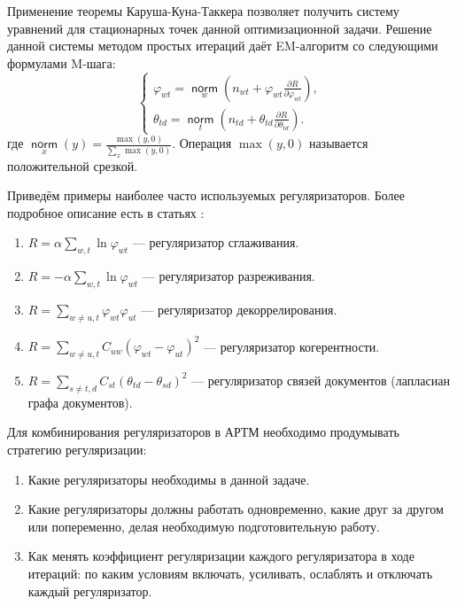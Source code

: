 \documentclass[12pt]{article}
\renewcommand{\phi}{\varphi}
\newcommand{\norm}{\mathop{\mathsf{norm}}\limits}
\begin{document}
Применение теоремы Каруша-Куна-Таккера позволяет получить систему уравнений для стационарных точек данной оптимизационной задачи. Решение данной системы методом простых итераций даёт EM-алгоритм со следующими формулами M-шага:
\[
\left\{
	\begin{aligned}
\phi_{wt} = \norm_w  \left(n_{wt} + \phi_{wt}\frac{\partial R}{\partial\phi_{wt}}\right),\\
\theta_{td} = \norm_t  \left(n_{td} + \theta_{td}\frac{\partial R}{\partial\theta_{td}}\right).
	\end{aligned}
\right.
\]
где $\norm_x(y) = \frac{\max(y, 0)}{\sum\limits_x \max(y, 0)}$. Операция $\max(y, 0)$ называется положительной срезкой.

Приведём примеры наиболее часто используемых регуляризаторов. Более подробное описание есть в статьях \cite{vorontsov2014additive, vorontsov2014tutorial, vorontsov2015additive}:
\begin{enumerate}
\item $R = \alpha \sum\limits_{w, t} \ln \phi_{wt}$ --- регуляризатор сглаживания.
\item $R = -\alpha \sum\limits_{w, t} \ln \phi_{wt}$ --- регуляризатор разреживания.
\item $R = \sum\limits_{w \neq u, t} \phi_{wt} \phi_{ut}$ --- регуляризатор декоррелирования.
\item $R = \sum\limits_{w \neq u, t} C_{uw}\left( \phi_{wt}  - \phi_{ut} \right)^2$ --- регуляризатор когерентности.
\item $R = \sum\limits_{s \neq t, d} C_{st}\left( \theta_{td}  - \theta_{sd} \right)^2$ --- регуляризатор связей документов (лапласиан графа документов).
\end{enumerate}

Для комбинирования регуляризаторов в АРТМ необходимо продумывать стратегию регуляризации:
\begin{enumerate}
\item Какие регуляризаторы необходимы в данной задаче.
\item Какие регуляризаторы должны работать одновременно, какие друг за другом или попеременно, делая необходимую подготовительную работу.
\item Как менять коэффициент регуляризации каждого регуляризатора в ходе итераций: по каким условиям включать, усиливать, ослаблять и отключать каждый регуляризатор.
\end{enumerate}
\end{document}
